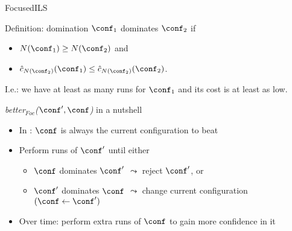 \begin{frame}[c,fragile]{FocusedILS}


\begin{block}{Definition: domination}
\alert{$\conf_1$ dominates $\conf_2$} if 
\begin{itemize}
	\item $N(\conf_1) \ge N(\conf_2)$ and 
	\item $\hat{c}_{N(\conf_2)}(\conf_1) \le \hat{c}_{N(\conf_2)}(\conf_2)$.
\end{itemize}
I.e.: we have at least as many runs for $\conf_1$ and its cost is at least as low.
\end{block}

\pause

\begin{block}{\textit{better$_{Foc}$($\conf', \conf$)} in a nutshell}
  \begin{itemize}
    \item In \paramils{}: $\conf$ is always the current configuration to beat
    \pause
	  \item Perform runs of $\conf'$ until either
		\begin{itemize}
			\item $\conf$ dominates $\conf'$ $\leadsto$ reject $\conf'$, or
			\item $\conf'$ dominates $\conf$ $\leadsto$ change current configuration $(\conf \leftarrow \conf')$
		\end{itemize}
	\pause	
	\item Over time: perform extra runs of $\conf$ to gain more confidence in it
	\end{itemize}
\end{block}

\end{frame}



